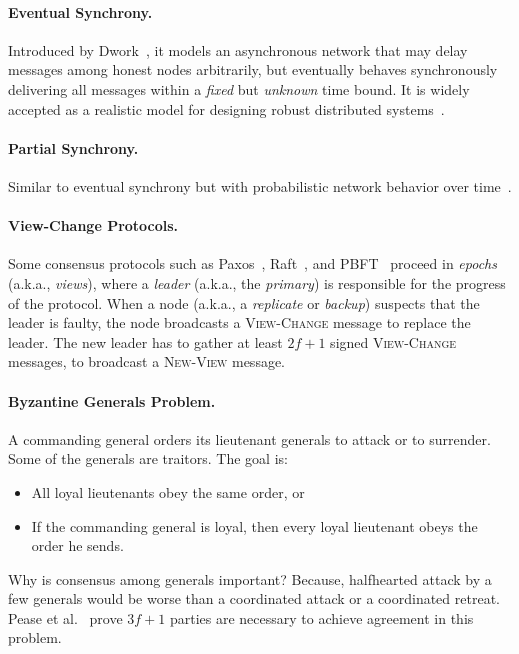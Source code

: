\documentclass[11pt]{article}
\theoremstyle{mytheoremstyle}
\begin{document}
\paragraph{Eventual Synchrony.} Introduced by Dwork~\cite{dwork:1988:cpp}, it models an asynchronous network that may delay messages among honest nodes arbitrarily, but eventually behaves synchronously delivering all messages within a \emph{fixed} but \emph{unknown} time bound. It is widely accepted as a realistic model for designing robust distributed systems~\cite{DBLP:journals/corr/CachinV17}.

\paragraph{Partial Synchrony.} Similar to eventual synchrony but with probabilistic network behavior over time~\cite{dwork:1988:cpp}.

\paragraph{View-Change Protocols.} Some consensus protocols such as Paxos~\cite{Lamport:1998:Paxos}, Raft~\cite{Raft:2014}, and PBFT~\cite{Castro:1999:PBFT} proceed in \emph{epochs} (a.k.a., \emph{views}), where a \emph{leader} (a.k.a., the \emph{primary}) is responsible for the progress of the protocol. When a node (a.k.a., a \emph{replicate} or \emph{backup}) suspects that the leader is faulty, the node broadcasts a \textsc{View-Change} message to replace the leader. The new leader has to gather at least $2f+1$ signed \textsc{View-Change} messages, to broadcast a \textsc{New-View} message.

\paragraph{Byzantine Generals Problem.} A commanding general orders its lieutenant generals to attack or to surrender. Some of the generals are traitors. The goal is:
\begin{itemize}
	\item All loyal lieutenants obey the same order, or
	\item If the commanding general is loyal, then every loyal lieutenant obeys the order he sends.
\end{itemize}

Why is consensus among generals important? Because, halfhearted attack by a few generals would be worse than a coordinated attack or a coordinated retreat. Pease et al.~\cite{pease80reaching} prove $3f+1$ parties are necessary to achieve agreement in this problem.


\end{document}
